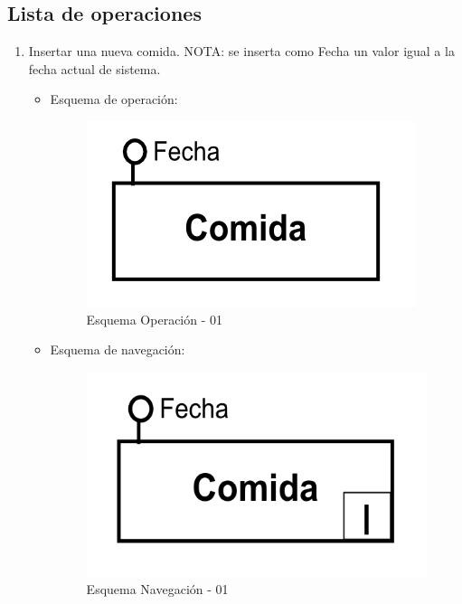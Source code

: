 \documentclass[a4paper,12pt]{report}
\begin{document}
\subsection{Lista de operaciones}
\label{sec-7-7-1}
\begin{enumerate}
\item Insertar una nueva comida.
NOTA: se inserta como Fecha un valor igual a la fecha actual de sistema.
\begin{itemize}
\item Esquema de operación:
\begin{figure}[!htp]
\centering
\includegraphics[width=0.5\linewidth]{./operaciones/img/Comidas/01_ope.png}
\caption{Esquema Operación - 01}
\label{fig:ope01}
\medskip
\footnotesize
{}
\end{figure}
\item Esquema de navegación:
\begin{figure}[!htp]
\centering
\includegraphics[width=0.5\linewidth]{./operaciones/img/Comidas/01_nav.png}
\caption{Esquema Navegación - 01}
\label{fig:nave01}
\medskip
\footnotesize
{}
\end{figure}
\end{itemize}


\end{enumerate}
\end{document}
